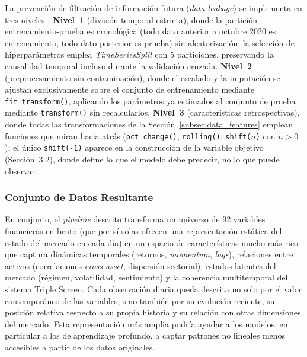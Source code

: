 ﻿\documentclass[11pt,a4paper]{article}
\begin{document}
La prevenci\'on de filtraci\'on de informaci\'on futura (\textit{data leakage}) se implementa en tres niveles \citep{lopezdeprado2018}. \textbf{Nivel~1} (divisi\'on temporal estricta), donde la partici\'on entrenamiento-prueba es cronol\'ogica (todo dato anterior a octubre 2020 es entrenamiento, todo dato posterior es prueba) sin aleatorizaci\'on; la selecci\'on de hiperpar\'ametros emplea \textit{TimeSeriesSplit} con 5 particiones, preservando la causalidad temporal incluso durante la validaci\'on cruzada. \textbf{Nivel~2} (preprocesamiento sin contaminaci\'on), donde el escalado y la imputaci\'on se ajustan exclusivamente sobre el conjunto de entrenamiento mediante \texttt{fit\_transform()}, aplicando los par\'ametros ya estimados al conjunto de prueba mediante \texttt{transform()} sin recalcularlos. \textbf{Nivel~3} (caracter\'isticas retrospectivas), donde todas las transformaciones de la Secci\'on~\ref{subsec:data_features} emplean funciones que miran hacia atr\'as (\texttt{pct\_change()}, \texttt{rolling()}, \texttt{shift($n$)} con $n > 0$); el \'unico \texttt{shift(-1)} aparece en la construcci\'on de la variable objetivo (Secci\'on~3.2), donde define lo que el modelo debe predecir, no lo que puede observar.

\subsubsection{Conjunto de Datos Resultante}

En conjunto, el \textit{pipeline} descrito transforma un universo de 92 variables financieras en bruto (que por s\'i solas ofrecen una representaci\'on est\'atica del estado del mercado en cada d\'ia) en un espacio de caracter\'isticas mucho m\'as rico que captura din\'amicas temporales (retornos, \textit{momentum}, \textit{lags}), relaciones entre activos (correlaciones \textit{cross-asset}, dispersi\'on sectorial), estados latentes del mercado (r\'egimen, volatilidad, sentimiento) y la coherencia multitemporal del sistema Triple Screen. Cada observaci\'on diaria queda descrita no solo por el valor contempor\'aneo de las variables, sino tambi\'en por su evoluci\'on reciente, su posici\'on relativa respecto a su propia historia y su relaci\'on con otras dimensiones del mercado. Esta representaci\'on m\'as amplia podr\'ia ayudar a los modelos, en particular a los de aprendizaje profundo, a captar patrones no lineales menos accesibles a partir de los datos originales.
\end{document}
